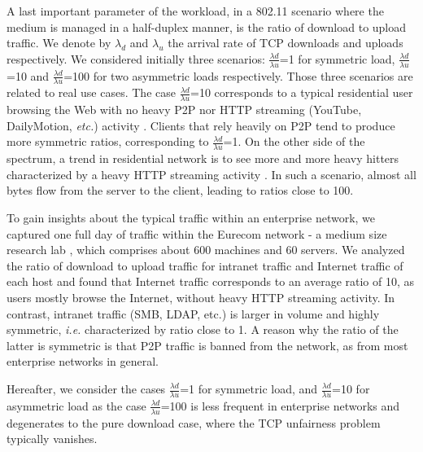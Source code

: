 \documentclass[preprint,12pt]{elsarticle}
\begin{document}
A last important parameter of the workload, in a 802.11 scenario where the medium is managed in a half-duplex manner, is the ratio of download to upload traffic. We denote by $\lambda_{d}$ and $\lambda_{u}$ the arrival rate of TCP downloads and uploads respectively. We considered initially  three scenarios: $\frac{\lambda{d}}{\lambda{u}}$=1 for symmetric load, $\frac{\lambda{d}}{\lambda{u}}$=10 and $\frac{\lambda{d}}{\lambda{u}}$=100 for two asymmetric loads respectively. Those three scenarios are related to real use cases. The case $\frac{\lambda{d}}{\lambda{u}}$=10  corresponds to a typical residential user browsing the Web with no  heavy P2P nor HTTP streaming (YouTube, DailyMotion, \textit{etc.}) activity \cite{Pietrzyk2011}. Clients that rely heavily on P2P tend to produce more symmetric ratios, corresponding to $\frac{\lambda{d}}{\lambda{u}}$=1. On the other side of the spectrum, a trend in residential network is to see more and more heavy hitters characterized by a heavy HTTP streaming activity \cite{Pietrzyk2011}. In such a scenario, almost all bytes flow from the server to the client, leading to ratios close to 100.


To gain insights about the typical traffic within an enterprise network, we captured one full day of traffic within the Eurecom network - a medium size research lab%
, which comprises about 600 machines and 60 servers. We analyzed the ratio of download to upload traffic for intranet traffic and Internet traffic of each host and found that Internet traffic corresponds to an average ratio of 10, as users mostly browse the Internet, without heavy HTTP streaming activity. In contrast, intranet traffic (SMB, LDAP, etc.) is  larger in volume and highly symmetric, \textit{i.e.} characterized by ratio close to 1. A reason why the ratio of the latter is symmetric is that P2P traffic is banned from the network, as from most enterprise networks in general. 


Hereafter, we consider the cases  $\frac{\lambda{d}}{\lambda{u}}$=1 for symmetric load, and $\frac{\lambda{d}}{\lambda{u}}$=10 for asymmetric load as the case $\frac{\lambda{d}}{\lambda{u}}$=100 is less frequent in enterprise networks and degenerates to the pure download case, where the TCP unfairness problem typically vanishes. %
\end{document}
